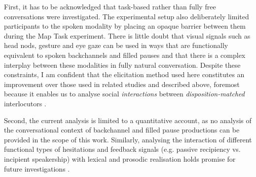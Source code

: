 First, it has to be acknowledged that task-based rather than fully free conversations were investigated. The experimental setup also deliberately limited participants to the spoken modality by placing an opaque barrier between them during the Map Task experiment. There is little doubt that visual signals such as head nods, gesture and eye gaze can be used in ways that are functionally equivalent to spoken backchannels \citep{bevacquaMultimodalBackchannelsEmbodied2010, hjalmarssonGazeDirectionBackchannel2012, meschManualBackchannelResponses2016, oertelGazePatternsTurntaking2012, saubestyMultimodalAnalysisHand2016, szatrowskiRelationGazeHead2000} and filled pauses \citep{beattiePlanningUnitsSpontaneous1979,broneEyeGazeViewpoint2017,kosmalaPreliminaryStudyHesitation2017} and that there is a complex interplay between these modalities in fully natural conversation. Despite these constraints, I am confident that the elicitation method used here constitutes an improvement over those used in related studies and described above, foremost because it enables us to analyse social \textit{interactions} between \textit{disposition-matched} interlocutors \citep[cf. ][]{dingemanseSingleMindednessFigureGroundReversal2023}.

Second, the current analysis is limited to a quantitative account, as no analysis of the conversational context of backchannel and filled pause productions can be provided in the scope of this work. Similarly, analysing the interaction of different functional types of hesitations and feedback signals (e.g. passive recipiency vs. incipient speakership) with lexical and prosodic realisation holds promise for future investigations \citep{jeffersonNotesSystematicDeployment1984, jurafskyLexicalProsodicSyntactic1998, savinoIntonationalStrategiesBackchanneling2010, sbrannaBackchannellingLanguagesRate2022,sbrannaUseBackchannelsOther2023}.

